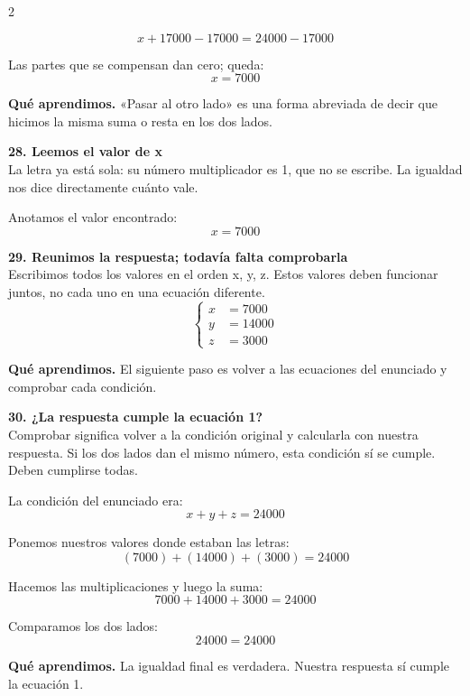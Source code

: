 \documentclass[11pt,a4paper,landscape]{article}
\begin{document}
\begin{multicols*}{2}
\begin{minipage}{\linewidth}
\[x + 17000 - 17000=24000 - 17000\]
\par\smallskip Las partes que se compensan dan cero; queda:
\[x=7000\]
\par\smallskip\textbf{Qué aprendimos.} «Pasar al otro lado» es una forma abreviada de decir que hicimos la misma suma o resta en los dos lados.
\end{minipage}\par\medskip
\noindent\begin{minipage}{\linewidth}\textbf{28. Leemos el valor de x}\\[2pt]La letra ya está sola: su número multiplicador es 1, que no se escribe. La igualdad nos dice directamente cuánto vale.
\par\smallskip Anotamos el valor encontrado:
\[x=7000\]
\end{minipage}\par\medskip
\noindent\begin{minipage}{\linewidth}\textbf{29. Reunimos la respuesta; todavía falta comprobarla}\\[2pt]Escribimos todos los valores en el orden x, y, z. Estos valores deben funcionar juntos, no cada uno en una ecuación diferente.
\[\left\{\begin{aligned}x&=7000\\y&=14000\\z&=3000\end{aligned}\right.\]
\par\smallskip\textbf{Qué aprendimos.} El siguiente paso es volver a las ecuaciones del enunciado y comprobar cada condición.
\end{minipage}\par\medskip
\noindent\begin{minipage}{\linewidth}\textbf{30. ¿La respuesta cumple la ecuación 1?}\\[2pt]Comprobar significa volver a la condición original y calcularla con nuestra respuesta. Si los dos lados dan el mismo número, esta condición sí se cumple. Deben cumplirse todas.
\par\smallskip La condición del enunciado era:
\[x + y + z = 24000\]
\par\smallskip Ponemos nuestros valores donde estaban las letras:
\[\left(7000\right) + \left(14000\right) + \left(3000\right)=24000\]
\par\smallskip Hacemos las multiplicaciones y luego la suma:
\[7000 + 14000 + 3000=24000\]
\par\smallskip Comparamos los dos lados:
\[24000=24000\]
\par\smallskip\textbf{Qué aprendimos.} La igualdad final es verdadera. Nuestra respuesta sí cumple la ecuación 1.

\end{minipage}
\end{multicols*}
\end{document}

